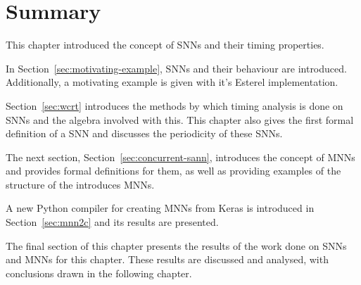 \section{Summary}
This chapter introduced the concept of \acfp{SNN} and their timing properties.

In Section~\ref{sec:motivating-example}, \acp{SNN} and their behaviour are introduced. 
Additionally, a motivating example is given with it's Esterel implementation.

Section~\ref{sec:wcrt} introduces the methods by which timing analysis is done on \acp{SNN} and the algebra involved with this.
This chapter also gives the first formal definition of a \ac{SNN} and discusses the periodicity of these \acp{SNN}.

The next section, Section~\ref{sec:concurrent-sann}, introduces the concept of \acfp{MNN} and provides formal definitions for them, as well as providing examples of the structure of the introduces \acp{MNN}.

A new Python compiler for creating \acp{MNN} from Keras is introduced in Section~\ref{sec:mnn2c} and its results are presented.

The final section of this chapter presents the results of the work done on \acp{SNN} and \acp{MNN} for this chapter.
These results are discussed and analysed, with conclusions drawn in the following chapter.
